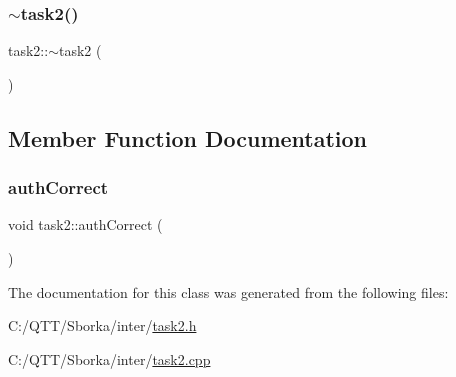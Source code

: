 \mbox{\label{classtask2_a556f5667a380cc0341cd8e585411849a}} 
\subsubsection{\texorpdfstring{$\sim$task2()}{~task2()}}
{\footnotesize\ttfamily task2\+::$\sim$task2 (\begin{DoxyParamCaption}{ }\end{DoxyParamCaption})}



\subsection{Member Function Documentation}
\mbox{\label{classtask2_ae1300135e91036758449e9d3ad21461d}} 
\subsubsection{\texorpdfstring{auth\+Correct}{authCorrect}}
{\footnotesize\ttfamily void task2\+::auth\+Correct (\begin{DoxyParamCaption}{ }\end{DoxyParamCaption})\hspace{0.3cm}{\ttfamily [signal]}}



The documentation for this class was generated from the following files\+:\begin{DoxyCompactItemize}
\item 
C\+:/\+Q\+T\+T/\+Sborka/inter/\mbox{\hyperlink{task2_8h}{task2.\+h}}\item 
C\+:/\+Q\+T\+T/\+Sborka/inter/\mbox{\hyperlink{task2_8cpp}{task2.\+cpp}}\end{DoxyCompactItemize}
